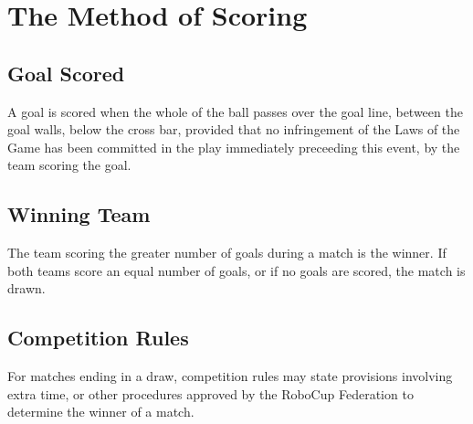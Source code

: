 \section{The Method of Scoring}\label{sec:method-of-scoring}

\subsection{Goal Scored}
A goal is scored when the whole of the ball passes over the goal line, between the goal walls, below the cross bar, provided that no infringement of the Laws of the Game has been committed in the play immediately preceeding this event, by the team scoring the goal.

\subsection{Winning Team}
The team scoring the greater number of goals during a match is the winner.
If both teams score an equal number of goals, or if no goals are scored, the match is drawn.

\subsection{Competition Rules}
For matches ending in a draw, competition rules may state provisions involving extra time, or other procedures approved by the RoboCup Federation to determine the winner of a match.
